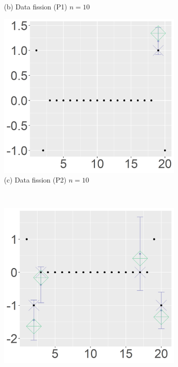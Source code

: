 \begin{figure}[ht!]
\begin{subfigure}[b]{.32\columnwidth}
    \caption{(b) Data fission (P1) $n=10$}
\end{subfigure}
\hfill
\centering
\begin{subfigure}[b]{.32\columnwidth} 
    \includegraphics[width=\columnwidth]{../../plot/p2_10_1_1.png}
    \caption{(c) Data fission (P2) $n=10$}
\end{subfigure}
\\
\centering
\begin{subfigure}[b]{.32\columnwidth} 
    \includegraphics[width=\columnwidth]{../../plot/split_20_1_1.png}

\end{subfigure}
\end{figure}

